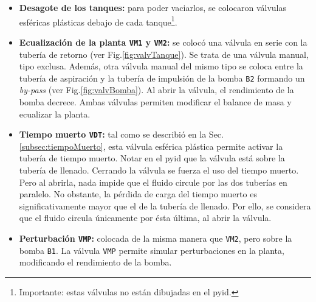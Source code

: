\begin{itemize}
  \item \textbf{Desagote de los tanques:}
  para poder vaciarlos, se colocaron válvulas esféricas plásticas debajo de
cada tanque\footnote{Importante: estas válvulas no están dibujadas en el
\gls{pyid}.}.

  \item \textbf{Ecualización de la planta \texttt{VM1} y \texttt{VM2}:} se
colocó una válvula en serie con la tubería de retorno (ver
Fig.\ref{fig:valvTanque}).
Se trata de una
válvula manual, tipo exclusa.
Además, otra válvula manual del mismo tipo se coloca entre la tubería de
aspiración y
la tubería de impulsión de la bomba \verb|B2| formando un \emph{by-pass} (ver
Fig.\ref{fig:valvBomba}).
Al abrir la válvula, el rendimiento de la bomba decrece.
  Ambas válvulas permiten modificar el balance de masa y ecualizar la planta.

  \item \textbf{Tiempo muerto \texttt{VDT}:}
  tal como se describió en la Sec. \ref{subsec:tiempoMuerto}, esta válvula
esférica plástica permite activar la tubería de tiempo muerto.
  Notar en el \gls{pyid} que la válvula está sobre la tubería de llenado.
  Cerrando la válvula se fuerza el uso del tiempo muerto. Pero al
abrirla, nada impide que el fluido circule por las dos tuberías en paralelo.
  No obstante, la pérdida de carga del tiempo muerto es significativamente
mayor que el de la tubería de llenado.
  Por ello, se considera que el fluido circula únicamente por ésta última, al
abrir la válvula.

  \item \textbf{Perturbación \texttt{VMP}:}
  colocada de la misma manera que \verb|VM2|, pero sobre la bomba \verb|B1|.
  La válvula \verb|VMP| permite simular perturbaciones en la planta,
modificando el rendimiento de la bomba.

\end{itemize}


